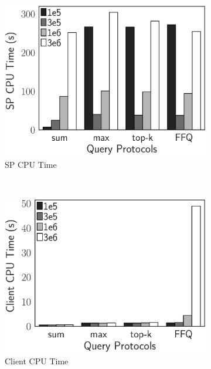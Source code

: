 \begin{figure}[t]
  \centering
  \begin{subfigure}[b]{.33\linewidth}
    \centering
    \includegraphics[width=\linewidth]{exp-figs/aggregate-queries/cardinality_sp.eps}
    \caption{SP CPU Time}
  \end{subfigure}~%
  \begin{subfigure}[b]{.33\linewidth}
    \centering
    \includegraphics[width=\linewidth]{exp-figs/aggregate-queries/cardinality_client.eps}
    \caption{Client CPU Time}
  \end{subfigure}~%
  \begin{subfigure}[b]{.33\linewidth}
    \centering

\end{subfigure}
\end{figure}
